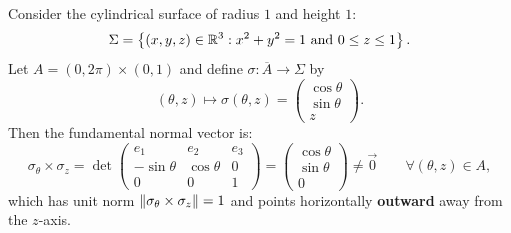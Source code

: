 \begin{exemple}
Consider the cylindrical surface of radius $1$ and height $1$:
\[
    \Sigma = \left\{(x,y,z) \in \mathbb{R}^3 : x^2 + y^2 = 1 \text{ and } 0 \le z \le 1\right\}.
\]
Let $A = (0, 2\pi) \times (0, 1)$ and define $\sigma : \overline{A} \to \Sigma$ by
\[
    (\theta, z) \mapsto \sigma(\theta, z) = \begin{pmatrix} \cos\theta \\ \sin\theta \\ z \end{pmatrix}.
\]
Then the fundamental normal vector is:
\[
    \sigma_\theta \times \sigma_z = \det \begin{pmatrix}
        e_1 & e_2 & e_3 \\
        -\sin\theta & \cos\theta & 0 \\
        0 & 0 & 1
    \end{pmatrix} = \begin{pmatrix} \cos\theta \\ \sin\theta \\ 0 \end{pmatrix} \neq \vec{0} \qquad \forall (\theta, z) \in A,
\]
which has unit norm $\left\lVert\sigma_\theta \times \sigma_z\right\rVert = 1$ and points horizontally \textbf{outward} away from the $z$-axis.
\end{exemple}

